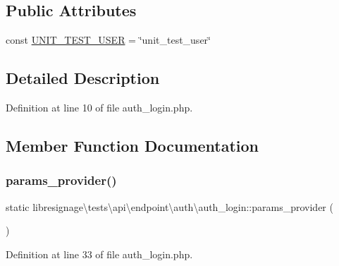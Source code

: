 \subsection*{Public Attributes}
\begin{DoxyCompactItemize}
\item 
const \hyperlink{classlibresignage_1_1tests_1_1api_1_1endpoint_1_1auth_1_1auth__login_a84cb333fed51a6addc5b8bb47f21f627}{U\+N\+I\+T\+\_\+\+T\+E\+S\+T\+\_\+\+U\+S\+ER} = \char`\"{}unit\+\_\+test\+\_\+user\char`\"{}
\end{DoxyCompactItemize}


\subsection{Detailed Description}


Definition at line 10 of file auth\+\_\+login.\+php.



\subsection{Member Function Documentation}
\mbox{\label{classlibresignage_1_1tests_1_1api_1_1endpoint_1_1auth_1_1auth__login_a9f357ecb6b6df658d6d3fa339bc4d73b}} 
\subsubsection{\texorpdfstring{params\+\_\+provider()}{params\_provider()}}
{\footnotesize\ttfamily static libresignage\textbackslash{}tests\textbackslash{}api\textbackslash{}endpoint\textbackslash{}auth\textbackslash{}auth\+\_\+login\+::params\+\_\+provider (\begin{DoxyParamCaption}{ }\end{DoxyParamCaption})\hspace{0.3cm}{\ttfamily [static]}}



Definition at line 33 of file auth\+\_\+login.\+php.

